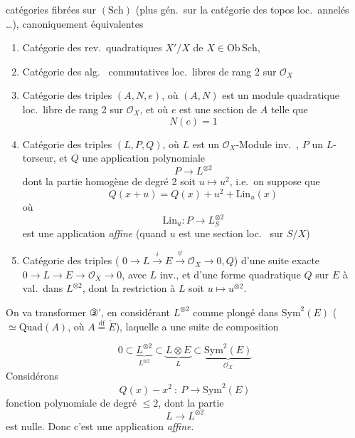 \documentclass[11pt,a4paper]{article}
\begin{document}
  catégories fibrées sur $(\mathrm{Sch})$ (plus gén.\ sur la catégorie des topos loc.\ annelés …), canoniquement équivalentes
\begin{enumerate}
  \item[①] Catégorie des rev.\ quadratiques $X'/X$ de $X \in \mathrm{Ob}\,\mathrm{Sch}$,
  \item[①'] Catégorie des alg.\  commutatives loc.\ libres de rang 2 sur $\mathcal{O}_{X}$
  \item[②] Catégorie des triples $(A, N, e)$, où $(A, N)$ est un module quadratique loc.\ libre de rang 2 sur $\mathcal{O}_{X}$, et où $e$ est une section de $A$ telle que
  \[
    N(e) = 1
  \]
  \item[③] Catégorie des triples $(L, P, Q)$, où $L$ est un $\mathcal{O}_{X}$-Module inv.\ , $P$ un $L$-torseur, et $Q$ une application polynomiale
  \[
    P \longrightarrow L^{\otimes 2}
  \]
  dont la partie homogène de degré 2 soit $u \mapsto u^{2}$, i.e.\ on suppose que
  \[
    Q(x + u) = Q(x) + u^{2} + \mathrm{Lin}_{u}(x)
  \]
  où
  \[
    \mathrm{Lin}_{u} : P \to L_{S}^{\otimes 2}
  \]
  est une application \emph{affine} (quand $u$ est une section loc.\  sur $S/X$)
  \item[③'] Catégorie des triples (  $0 \to L \xrightarrow{\ i\ } E \xrightarrow{\ \psi\ } \mathcal{O}_{X} \to 0, Q$) d'une suite exacte $0 \to L \to E \to \mathcal{O}_{X} \to 0$, avec $L$ inv., et d'une forme quadratique $Q$ sur $E$ à val.\ dans $L^{\otimes 2}$, dont la restriction à $L$ soit $u \mapsto u^{\otimes 2}$.
\end{enumerate}

On va transformer ③', en \struck{\ill{}} considérant $L^{\otimes 2}$ comme plongé dans $\mathrm{Sym}^{2}(E)$ ($\simeq \mathrm{Quad}(A)$, où $A \overset{\mathrm{df}}{=} \check{E}$), laquelle a une suite de composition

\[
  0 \subset \underbrace{L^{\otimes 2}}_{L^{\otimes 2}} \subset \underbrace{L \otimes E}_{L} \subset \underbrace{\mathrm{Sym}^{2}(E)}_{\mathcal{O}_{X}}
\]
Considérons 
\[
  Q(x) - x^{2} \ : \ P \to \mathrm{Sym}^{2}(E)
\]
fonction polynomiale de degré \struck{\ill{}} $\leq 2$, \struck{\ill{}} dont la partie   
\[
  L \to L^{\otimes 2}
\]
est nulle. Donc c'est une application \emph{affine}.
\end{document}
